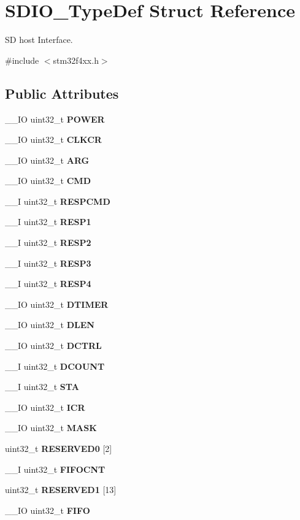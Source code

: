 \section{S\+D\+I\+O\+\_\+\+Type\+Def Struct Reference}
\label{structSDIO__TypeDef}


SD host Interface.  




{\ttfamily \#include $<$stm32f4xx.\+h$>$}

\subsection*{Public Attributes}
\begin{DoxyCompactItemize}
\item 
\+\_\+\+\_\+\+IO uint32\+\_\+t \textbf{ P\+O\+W\+ER}
\item 
\+\_\+\+\_\+\+IO uint32\+\_\+t \textbf{ C\+L\+K\+CR}
\item 
\+\_\+\+\_\+\+IO uint32\+\_\+t \textbf{ A\+RG}
\item 
\+\_\+\+\_\+\+IO uint32\+\_\+t \textbf{ C\+MD}
\item 
\+\_\+\+\_\+I uint32\+\_\+t \textbf{ R\+E\+S\+P\+C\+MD}
\item 
\+\_\+\+\_\+I uint32\+\_\+t \textbf{ R\+E\+S\+P1}
\item 
\+\_\+\+\_\+I uint32\+\_\+t \textbf{ R\+E\+S\+P2}
\item 
\+\_\+\+\_\+I uint32\+\_\+t \textbf{ R\+E\+S\+P3}
\item 
\+\_\+\+\_\+I uint32\+\_\+t \textbf{ R\+E\+S\+P4}
\item 
\+\_\+\+\_\+\+IO uint32\+\_\+t \textbf{ D\+T\+I\+M\+ER}
\item 
\+\_\+\+\_\+\+IO uint32\+\_\+t \textbf{ D\+L\+EN}
\item 
\+\_\+\+\_\+\+IO uint32\+\_\+t \textbf{ D\+C\+T\+RL}
\item 
\+\_\+\+\_\+I uint32\+\_\+t \textbf{ D\+C\+O\+U\+NT}
\item 
\+\_\+\+\_\+I uint32\+\_\+t \textbf{ S\+TA}
\item 
\+\_\+\+\_\+\+IO uint32\+\_\+t \textbf{ I\+CR}
\item 
\+\_\+\+\_\+\+IO uint32\+\_\+t \textbf{ M\+A\+SK}
\item 
uint32\+\_\+t \textbf{ R\+E\+S\+E\+R\+V\+E\+D0} [2]
\item 
\+\_\+\+\_\+I uint32\+\_\+t \textbf{ F\+I\+F\+O\+C\+NT}
\item 
uint32\+\_\+t \textbf{ R\+E\+S\+E\+R\+V\+E\+D1} [13]
\item 
\+\_\+\+\_\+\+IO uint32\+\_\+t \textbf{ F\+I\+FO}
\end{DoxyCompactItemize}


